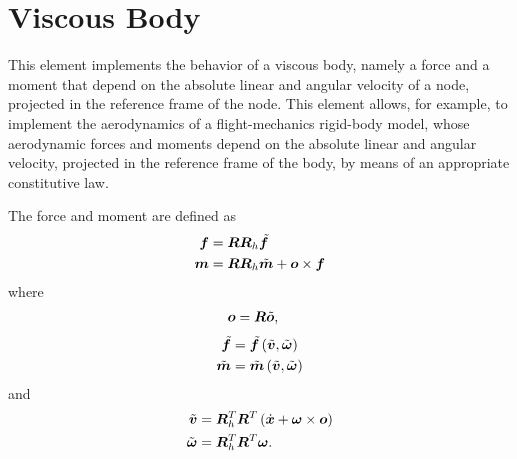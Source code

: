 \section{Viscous Body}
This element implements the behavior of a viscous body,
namely a force and a moment that depend on the absolute
linear and angular velocity of a node, projected in the reference frame
of the node.
This element allows, for example, to implement the aerodynamics
of a flight-mechanics rigid-body model, whose aerodynamic forces
and moments depend on the absolute linear and angular velocity,
projected in the reference frame of the body, by means of an appropriate
constitutive law.

The force and moment are defined as
\begin{subequations}
\begin{align}
	\bm{f} &= \bm{R} \bm{R}_h \tilde{\bm{f}}
	\\
	\bm{m} &= \bm{R} \bm{R}_h \tilde{\bm{m}}
		+ \bm{o} \times \bm{f}
\end{align}
\end{subequations}
where
\begin{align}
	\bm{o} &= \bm{R} \tilde{\bm{o}}
	,
\end{align}
\begin{subequations}
\begin{align}
	\tilde{\bm{f}} &= \tilde{\bm{f}}\left( \tilde{\bm{v}}, \tilde{\bm{\omega}} \right)
	\\
	\tilde{\bm{m}} &= \tilde{\bm{m}}\left( \tilde{\bm{v}}, \tilde{\bm{\omega}} \right)
\end{align}
\end{subequations}
and
\begin{subequations}
\begin{align}
	\tilde{\bm{v}} &= \bm{R}_h^T \bm{R}^T\left( 
		\dot{\bm{x}} + \bm{\omega}\times\bm{o}
	 \right)
	\\
	\tilde{\bm{\omega}} &= \bm{R}_h^T \bm{R}^T\bm{\omega}
	.
\end{align}
\end{subequations}

